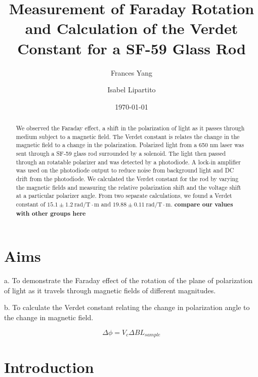 \documentclass[prb,preprint]{revtex4-1}
\begin{document}
\title{Measurement of Faraday Rotation and Calculation of the Verdet Constant for a SF-59 Glass Rod}

\author{Frances Yang}

\author{Isabel Lipartito}

\date{\today}

\begin{abstract}
{We observed the Faraday effect, a shift in the polarization of light as it passes through medium subject to a magnetic field. The Verdet constant is relates the change in the magnetic field to a change in the polarization.  Polarized light from a 650 nm laser was sent through a SF-59 glass rod surrounded by a solenoid. The light then passed through an rotatable polarizer and was detected by a photodiode. A lock-in amplifier was used on the photodiode output to reduce noise from background light and DC drift from the photodiode. We calculated the Verdet constant for the rod by varying the magnetic fields and measuring the relative polarization shift and the voltage shift at a particular polarizer angle. From two separate calculations, we found a Verdet constant of $15.1 \pm 1.2 \mathrm{~rad/T} \cdot \textrm{m}$ and $19.88 \pm 0.11 \mathrm{~rad/T} \cdot \textrm{m}$. {\bf compare our values with other groups here
}}
\end{abstract}

\maketitle 
\section{Aims}
{a.  To demonstrate the Faraday effect of the rotation of the plane of polarization of light as it travels through magnetic fields of different magnitudes.

b.  To calculate the Verdet constant relating the change in polarization angle to the change in magnetic field.}
\begin{equation}
\Delta \phi =V_{c} \Delta B L{_{sample}}
\end{equation}

\section{Introduction} 
\end{document}
